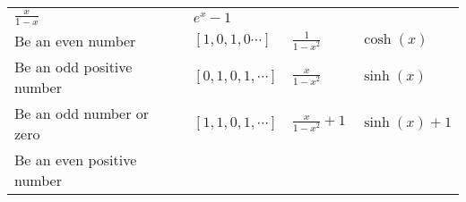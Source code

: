 \begin{longtable}[]{@{}llll@{}}
\begin{minipage}[t]{0.22\columnwidth}
\(\frac x {1-x}\)\strut
\end{minipage} & \begin{minipage}[t]{0.22\columnwidth}\raggedright
\(e^x - 1\)\strut
\end{minipage}\tabularnewline
\begin{minipage}[t]{0.22\columnwidth}\raggedright
Be an even number\strut
\end{minipage} & \begin{minipage}[t]{0.22\columnwidth}\raggedright
\([1,0,1,0\cdots]\)\strut
\end{minipage} & \begin{minipage}[t]{0.22\columnwidth}\raggedright
\(\frac 1 {1-x^2}\)\strut
\end{minipage} & \begin{minipage}[t]{0.22\columnwidth}\raggedright
\(\cosh(x)\)\strut
\end{minipage}\tabularnewline
\begin{minipage}[t]{0.22\columnwidth}\raggedright
Be an odd positive number\strut
\end{minipage} & \begin{minipage}[t]{0.22\columnwidth}\raggedright
\([0,1,0,1,\cdots]\)\strut
\end{minipage} & \begin{minipage}[t]{0.22\columnwidth}\raggedright
\(\frac x {1-x^2}\)\strut
\end{minipage} & \begin{minipage}[t]{0.22\columnwidth}\raggedright
\(\sinh(x)\)\strut
\end{minipage}\tabularnewline
\begin{minipage}[t]{0.22\columnwidth}\raggedright
Be an odd number or zero\strut
\end{minipage} & \begin{minipage}[t]{0.22\columnwidth}\raggedright
\([1,1,0,1,\cdots]\)\strut
\end{minipage} & \begin{minipage}[t]{0.22\columnwidth}\raggedright
\(\frac x {1-x^2} + 1\)\strut
\end{minipage} & \begin{minipage}[t]{0.22\columnwidth}\raggedright
\(\sinh(x)+1\)\strut
\end{minipage}\tabularnewline
\begin{minipage}[t]{0.22\columnwidth}\raggedright
Be an even positive number\strut
\end{minipage} & \begin{minipage}[t]{0.22\columnwidth}\raggedright

\end{minipage}
\end{longtable}
